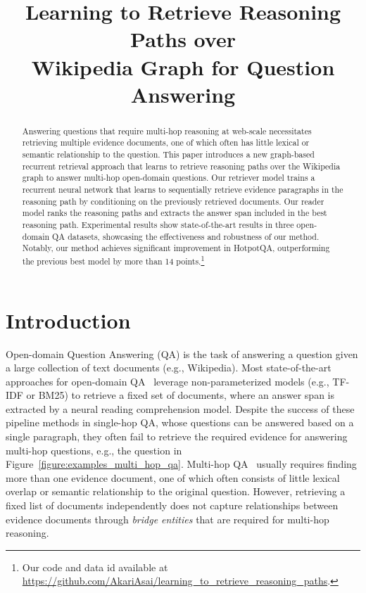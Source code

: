 \title{Learning to Retrieve Reasoning Paths over \\  Wikipedia Graph for  Question Answering}



\maketitle

\begin{abstract}
Answering questions that require multi-hop reasoning at web-scale necessitates retrieving multiple evidence documents, one of which often has little lexical or semantic relationship to the question. This paper introduces a new graph-based recurrent retrieval approach that learns to retrieve reasoning paths over the Wikipedia graph to answer multi-hop open-domain questions. 
Our retriever model trains a recurrent neural network that learns to sequentially retrieve evidence paragraphs in the reasoning path by conditioning on the previously retrieved documents. 
Our reader model ranks the reasoning paths and extracts the answer span included in the best reasoning path.
Experimental results show state-of-the-art results in three open-domain QA datasets, showcasing the effectiveness and robustness of our method. Notably, our method achieves significant improvement in HotpotQA, outperforming the previous best model by more than 14 points.\footnote{Our code and data id available at \url{https://github.com/AkariAsai/learning_to_retrieve_reasoning_paths}.}

\end{abstract}

\section{Introduction}

Open-domain Question Answering (QA) is the task of answering a question given a large collection of text documents (e.g., Wikipedia).
Most state-of-the-art approaches for open-domain QA~\citep{chen2017reading,wang2018r,lee2018ranking,yang-etal-2019-end-end} leverage non-parameterized models (e.g., TF-IDF or BM25) to retrieve a fixed set of documents, where an answer span is extracted by a neural reading comprehension model. 
Despite the success of these pipeline methods in single-hop QA, whose questions can be answered based on a single paragraph, they often fail to retrieve the required evidence for answering multi-hop questions, e.g., the question in Figure~\ref{figure:examples_multi_hop_qa}.
Multi-hop QA~\citep{yang-etal-2018-hotpotqa} usually requires finding more than one evidence document, one of which often consists of little lexical overlap or semantic relationship to the original question.
However, retrieving a fixed list of documents independently does not capture relationships between evidence documents through {\it bridge entities} that are required for multi-hop reasoning. 

